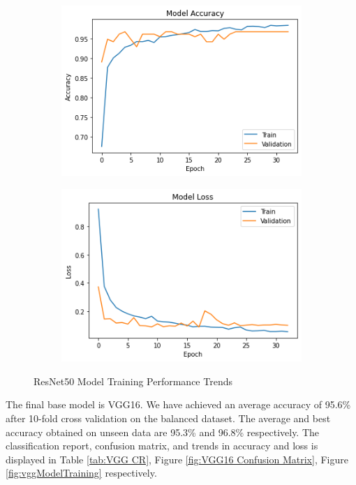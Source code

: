 \vspace{-\parskip}
\begin{figure}[H]
        \begin{subfigure}[b]{0.5\textwidth}
                \includegraphics[width=\linewidth]{Images/ResNetAcc.png}
        \end{subfigure}%
        \begin{subfigure}[b]{0.5\textwidth}
                \includegraphics[width=\linewidth]{Images/ResNetLoss.png}
        \end{subfigure}%
        \caption{ResNet50 Model Training Performance Trends}\label{fig:resnetModelTraining}
\end{figure}
\vspace{-1em}
The final base model is VGG16. We have achieved an average accuracy of 95.6\% after 10-fold cross validation on the balanced dataset. The average and best accuracy obtained on unseen data are 95.3\% and 96.8\% respectively. The classification report, confusion matrix, and trends in accuracy and loss is displayed in Table \ref{tab:VGG CR}, Figure \ref{fig:VGG16 Confusion Matrix}, Figure \ref{fig:vggModelTraining} respectively.

